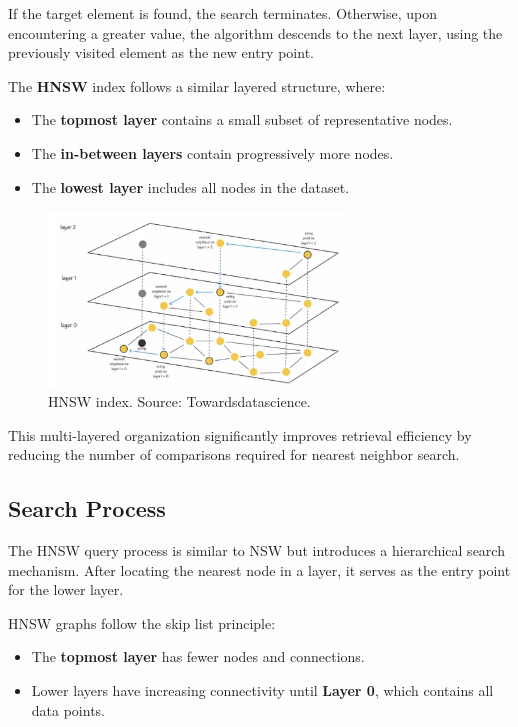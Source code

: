 If the target element is found, the search terminates. Otherwise, upon encountering a greater value, the algorithm descends to the next layer, using the previously visited element as the new entry point.  


The \textbf{HNSW} index follows a similar layered structure, where:
\begin{itemize}
    \item The \textbf{topmost layer} contains a small subset of representative nodes.
    \item The \textbf{in-between layers} contain progressively more nodes.
    \item The \textbf{lowest layer} includes all nodes in the dataset.
\end{itemize}
\begin{figure}[h]
    \centering
\includegraphics[width=0.7\textwidth]{IMAGES/immagine_2025-02-27_133909960.png}
    \caption{HNSW index. Source: Towardsdatascience.\footnotemark[2]}
    \label{fig:HNSW}
\end{figure}
This multi-layered organization significantly improves retrieval efficiency by reducing the number of comparisons required for nearest neighbor search.  

\subsection{Search Process}  

The HNSW query process is similar to NSW but introduces a hierarchical search mechanism. After locating the nearest node in a layer, it serves as the entry point for the lower layer.  

HNSW graphs follow the skip list principle:  
\begin{itemize}  
    \item The \textbf{topmost layer} has fewer nodes and connections.  
    \item Lower layers have increasing connectivity until \textbf{Layer 0}, which contains all data points.  
\end{itemize}  

